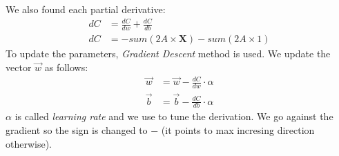 We also found each partial derivative:
\begin{align}
  dC &= \frac{dC}{dw} + \frac{dC}{db} \\
 dC &= -sum(2A\times{}\mathbf{X}) - sum(2A\times{}1)
\end{align}
To update the parameters, \textit{Gradient Descent} method is used. We update the vector $\vec{w}$ as follows:
\begin{align}
  \vec{w} &= \vec{w} -\frac{dC}{dw}\cdot{}\alpha\\
  \vec{b} &= \vec{b} -\frac{dC}{db}\cdot{}\alpha
\end{align}
$\alpha$ is called \textit{learning rate} and we use to tune the derivation. We go against the gradient so the sign is changed to $-$ (it points to max incresing direction otherwise).
